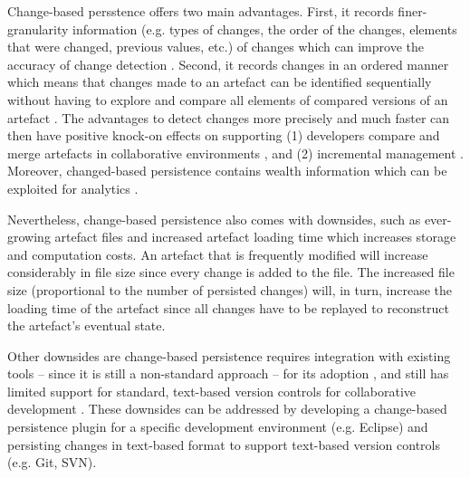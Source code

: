 Change-based persstence offers two main advantages. First, it records finer-granularity information (e.g. types of changes, the order of the changes, elements that were changed, previous values, etc.) of changes which can improve the accuracy of change detection \cite{DBLP:journals/entcs/RobbesL07,DBLP:conf/sde/LippeO92,DBLP:conf/caise/IgnatN05,mens2002state}. Second, it records changes in an ordered manner which means that changes made to an artefact can be identified sequentially without having to explore and compare all elements of compared versions of an artefact \cite{DBLP:conf/edoc/KoegelHLHD10}. The advantages to detect changes more precisely and much faster can then have positive knock-on effects on supporting (1) developers compare and merge artefacts in collaborative environments \cite{DBLP:conf/sde/LippeO92,DBLP:conf/caise/IgnatN05,koegel2010emfstore}, and (2) incremental management \cite{jouault2010towards,DBLP:conf/ecmdafa/OgunyomiRK15, DBLP:conf/ecmdafa/RathHV12}. Moreover, changed-based persistence contains wealth information which can be exploited for analytics \cite{DBLP:journals/entcs/RobbesL07}.

Nevertheless, change-based persistence also comes with downsides, such as ever-growing artefact files  \cite{DBLP:journals/entcs/RobbesL07,DBLP:conf/edoc/KoegelHLHD10} and increased artefact loading time \cite{mens2002state} which increases storage and computation costs. An artefact that is frequently modified will increase considerably in file size since every change is added to the file. The increased file size (proportional to the number of persisted changes) will, in turn, increase the loading time of the artefact since all changes have to be replayed to reconstruct the artefact's eventual state. 


Other downsides are change-based persistence requires 
integration with existing tools -- since it is still a non-standard approach -- for its adoption \cite{koegel2010emfstore}, 
and still has limited support for standard, text-based version controls for collaborative development \cite{koegel2010emfstore}. 
These downsides can be addressed by developing a change-based persistence plugin for a specific development environment 
(e.g. Eclipse) and persisting changes in text-based format to support text-based version controls (e.g. Git, SVN).

